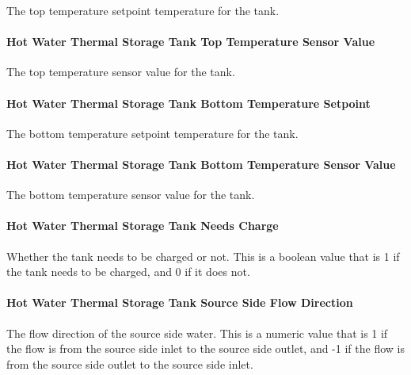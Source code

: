The top temperature setpoint temperature for the tank.

\paragraph{Hot Water Thermal Storage Tank Top Temperature Sensor Value}\label{hot-water-thermal-storage-top-temperature-sensor-value-thermalstoragehotwaterstratified}

The top temperature sensor value for the tank.

\paragraph{Hot Water Thermal Storage Tank Bottom Temperature Setpoint}\label{hot-water-thermal-storage-bottom-temperature-setpoint-thermalstoragehotwaterstratified}

The bottom temperature setpoint temperature for the tank.

\paragraph{Hot Water Thermal Storage Tank Bottom Temperature Sensor Value}\label{hot-water-thermal-storage-bottom-temperature-sensor-value-thermalstoragehotwaterstratified}

The bottom temperature sensor value for the tank.

\paragraph{Hot Water Thermal Storage Tank Needs Charge}\label{hot-water-thermal-storage-needs-charge-thermalstoragehotwaterstratified}

Whether the tank needs to be charged or not. This is a boolean value that is 1
if the tank needs to be charged, and 0 if it does not.

\paragraph{Hot Water Thermal Storage Tank Source Side Flow Direction}\label{hot-water-thermal-storage-source-side-flow-direction-thermalstoragehotwaterstratified}

The flow direction of the source side water. This is a numeric value that is 1
if the flow is from the source side inlet to the source side outlet, and -1 if
the flow is from the source side outlet to the source side inlet.

